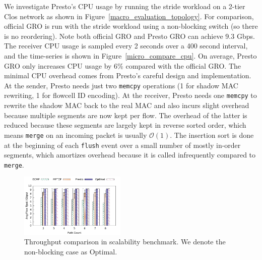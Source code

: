 We investigate Presto's CPU usage by
running the stride workload on a 2-tier Clos network as shown in Figure~\ref{macro_evaluation_topology}. 
For comparison, official GRO is run with the stride workload using a non-blocking switch (so there
is no reordering). Note both official GRO and Presto GRO can achieve 9.3 Gbps.  
The receiver CPU usage is sampled every 2 seconds over a 400 second interval, and
the time-series is shown in Figure~\ref{micro_compare_cpu}. 
On average, Presto GRO only increases CPU usage by 6\% compared with the official GRO. 
The minimal CPU overhead comes from Presto's careful design and implementation. 
At the sender, Presto needs just two {\tt memcpy} operations (1 for shadow MAC rewriting, 1 for flowcell ID encoding). 
At the receiver, Presto needs one {\tt memcpy} to rewrite the shadow MAC back to the real MAC and
also incurs slight overhead because multiple segments are now kept per flow. The overhead
of the latter is reduced because these segments are largely kept in reverse sorted order, which means {\tt merge}
on an incoming packet is usually $\mathcal{O}(1)$. The insertion sort is done at the beginning of each {\tt flush} event over a small
number of mostly in-order segments, which amortizes overhead because it is called infrequently compared to {\tt merge}.

\begin{figure}[t]
        \centering
  \includegraphics[width=0.45\textwidth]{presto/figures/scalability_test/scalability_compare_tput_witherrbar.pdf}
        \caption{Throughput comparison in scalability benchmark. We denote the non-blocking case as Optimal. 
		} 
        \label{micro_scalability_test_tput}
\end{figure}

